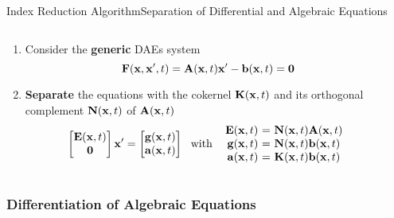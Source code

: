 \begin{frame}{Index Reduction Algorithm}{Separation of Differential and Algebraic Equations}
  \vspace{-1.0em}
  \begin{columns}
    \begin{column}[c]{0.6\textwidth}
      \begin{enumerate}[<+->]
        \item Consider the \textbf{generic} \acsp{DAE} system
        \begin{equation*}
          \mathbf{F}(\mathbf{x}, \mathbf{x}^\prime, t) = \mathbf{A}(\mathbf{x}, t) \mathbf{x}^\prime - \mathbf{b}(\mathbf{x}, t) = \mathbf{0}
        \end{equation*}
        \item \textbf{Separate} the equations with the cokernel $\mathbf{K}(\mathbf{x}, t)$ and its orthogonal complement $\mathbf{N}(\mathbf{x}, t)$ of $\mathbf{A}(\mathbf{x}, t)$
        \begin{equation*}
          \begin{bmatrix} \mE \\ \m{0} \end{bmatrix} \mxp = \begin{bmatrix} \mg \\ \ma \end{bmatrix}
          ~~ \text{with} ~~
          \begin{array}{r@{~}c@{~}l}
            \mE &=& \mN \mA \\
            \mg &=& \mN \mb \\
            \ma &=& \mK \mb
          \end{array}
        \end{equation*}
      \end{enumerate}
      \vspace{-1.0em}
    \end{column}
    \begin{column}[c]{0.4\textwidth}
    \end{column}
  \end{columns}
\end{frame}

\subsubsection{Differentiation of Algebraic Equations}

